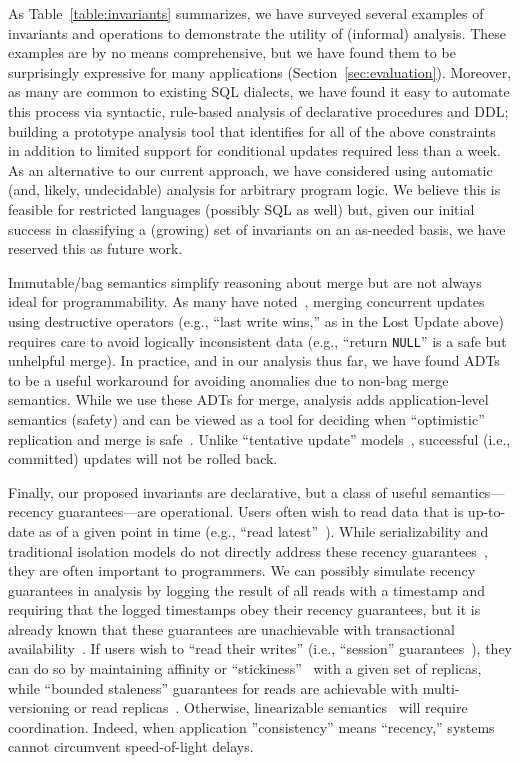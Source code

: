 As Table~\ref{table:invariants} summarizes, we have surveyed several
examples of invariants and operations to demonstrate the utility of
(informal) \iconfluence analysis. These examples are by no means
comprehensive, but we have found them to be surprisingly expressive
for many applications (Section~\ref{sec:evaluation}). Moreover, as
many are common to existing SQL dialects, we have found it easy to
automate this process via syntactic, rule-based analysis of
declarative procedures and DDL; building a prototype analysis tool
that identifies \iconfluence for all of the above constraints in
addition to limited support for conditional updates required less than
a week. As an alternative to our current approach, we have considered
using automatic (and, likely, undecidable) analysis for arbitrary
program logic. We believe this is feasible for restricted languages
(possibly SQL as well) but, given our initial success in classifying a
(growing) set of invariants on an as-needed basis, we have reserved
this as future work.

Immutable/bag semantics simplify reasoning about merge but are not
always ideal for programmability. As many have
noted~\cite{bayou,tamer-book,dynamo}, merging concurrent updates using
destructive operators (e.g., ``last write wins,'' as in the Lost
Update above) requires care to avoid logically inconsistent data
(e.g., ``return \texttt{NULL}'' is a safe but unhelpful merge). In
practice, and in our analysis thus far, we have found ADTs to be a
useful workaround for avoiding anomalies due to non-bag merge
semantics. While we use these ADTs for merge, \iconfluence analysis
adds application-level semantics (safety) and can be viewed as a tool
for deciding when ``optimistic'' replication and merge is
safe~\cite{optimistic}. Unlike ``tentative update''
models~\cite{tamer-book}, successful (i.e., committed) updates will
not be rolled back.

Finally, our proposed invariants are declarative, but a class of
useful semantics---recency guarantees---are operational. Users often
wish to read data that is up-to-date as of a given point in time
(e.g., ``read latest''~\cite{pnuts}). While serializability and
traditional isolation models do not directly address these recency
guarantees~\cite{adya-isolation}, they are often important to
programmers. We can possibly simulate recency guarantees in
\iconfluence analysis by logging the result of all reads with a
timestamp and requiring that the logged timestamps obey their recency
guarantees, but it is already known that these guarantees are
unachievable with transactional availability~\cite{hat-vldb}. If users
wish to ``read their writes'' (i.e., ``session''
guarantees~\cite{bayou}), they can do so by maintaining affinity or
``stickiness''~\cite{hat-vldb,vogels-defs} with a given set of
replicas, while ``bounded staleness'' guarantees for reads are
achievable with multi-versioning or read
replicas~\cite{pnuts}. Otherwise, linearizable
semantics~\cite{spanner} will require coordination. Indeed, when
application ''consistency'' means ``recency,'' systems cannot
circumvent speed-of-light delays.

